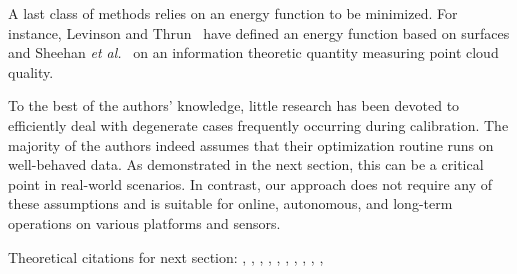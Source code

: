 A last class of methods relies on an energy function to be minimized. For
instance, Levinson and Thrun~\cite{levinson10unsupervised} have defined an
energy function based on surfaces and Sheehan \emph{et al.}~\cite{sheehan12self}
on an information theoretic quantity measuring point cloud quality.

To the best of the authors' knowledge, little research has been devoted to
efficiently deal with degenerate cases frequently occurring during calibration.
The majority of the authors indeed assumes that their optimization routine runs
on well-behaved data. As demonstrated in the next section, this can be a
critical point in real-world scenarios. In contrast, our approach does not
require any of these assumptions and is suitable for online, autonomous, and
long-term operations on various platforms and sensors.

Theoretical citations for next section: \cite{davis11algorithm}, \cite{aster11parameter},
\cite{chan94lowrank}, \cite{finsterle11truncated}, \cite{golub96matrix},
\cite{hansen87truncated}, \cite{hong92rank}, \cite{jauffret07observability},
\cite{kitagawa01regularization},
\cite{mackay05information}, 
 \cite{kaess09covariance}
